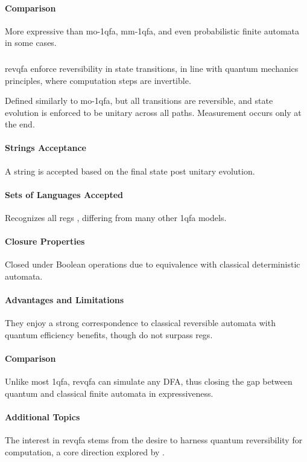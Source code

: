 \paragraph{Comparison}
More expressive than \gls{mo-1qfa}, \gls{mm-1qfa}, and even probabilistic finite automata in some cases.

\subsubsection{}
\gls{revqfa} enforce reversibility in state transitions, in line with quantum mechanics principles, where computation steps are invertible.

\begin{definition}
Defined similarly to \gls{mo-1qfa}, but all transitions are reversible, and state evolution is enforced to be unitary across all paths. Measurement occurs only at the end.
\end{definition}

\paragraph{Strings Acceptance}
A string is accepted based on the final state post unitary evolution.

\paragraph{Sets of Languages Accepted}
Recognizes all \glspl{reg} \cite{yamakami2014one}, differing from many other \gls{1qfa} models.

\paragraph{Closure Properties}
Closed under Boolean operations due to equivalence with classical deterministic automata.

\paragraph{Advantages and Limitations}
They enjoy a strong correspondence to classical reversible automata with quantum efficiency benefits, though do not surpass \glspl{reg}.

\paragraph{Comparison}
Unlike most \gls{1qfa}, \gls{revqfa} can simulate any DFA, thus closing the gap between quantum and classical finite automata in expressiveness.

\paragraph{Additional Topics}
The interest in \gls{revqfa} stems from the desire to harness quantum reversibility for computation, a core direction explored by \cite{ciamarra2001quantum}.
